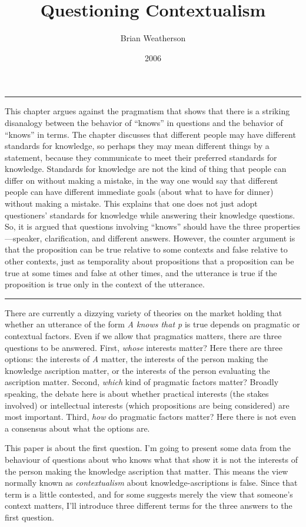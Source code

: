 \documentclass[
  10pt,
  letterpaper,
  DIV=11,
  numbers=noendperiod,
  twoside]{scrartcl}
\title{Questioning Contextualism}
\author{Brian Weatherson}
\date{2006}
\renewenvironment{abstract}
 {\vspace{-1.25cm}
 \quotation\small\noindent\rule{\linewidth}{.5pt}\par\smallskip
 \noindent }
 {\par\noindent\rule{\linewidth}{.5pt}\endquotation}
\begin{document}
\maketitle
\begin{abstract}
This chapter argues against the pragmatism that shows that there is a
striking disanalogy between the behavior of ``knows'' in questions and
the behavior of ``knows'' in terms. The chapter discusses that different
people may have different standards for knowledge, so perhaps they may
mean different things by a statement, because they communicate to meet
their preferred standards for knowledge. Standards for knowledge are not
the kind of thing that people can differ on without making a mistake, in
the way one would say that different people can have different immediate
goals (about what to have for dinner) without making a mistake. This
explains that one does not just adopt questioners' standards for
knowledge while answering their knowledge questions. So, it is argued
that questions involving ``knows'' should have the three
properties---speaker, clarification, and different answers. However, the
counter argument is that the proposition can be true relative to some
contexts and false relative to other contexts, just as temporality about
propositions that a proposition can be true at some times and false at
other times, and the utterance is true if the proposition is true only
in the context of the utterance.
\end{abstract}


There are currently a dizzying variety of theories on the market holding
that whether an utterance of the form \emph{A knows that p} is true
depends on pragmatic or contextual factors. Even if we allow that
pragmatics matters, there are three questions to be answered. First,
\emph{whose} interests matter? Here there are three options: the
interests of \emph{A} matter, the interests of the person making the
knowledge ascription matter, or the interests of the person evaluating
the ascription matter. Second, \emph{which} kind of pragmatic factors
matter? Broadly speaking, the debate here is about whether practical
interests (the stakes involved) or intellectual interests (which
propositions are being considered) are most important. Third, \emph{how}
do pragmatic factors matter? Here there is not even a consensus about
what the options are.

This paper is about the first question. I'm going to present some data
from the behaviour of questions about who knows what that show it is not
the interests of the person making the knowledge ascription that matter.
This means the view normally known as \emph{contextualism} about
knowledge-ascriptions is false. Since that term is a little contested,
and for some suggests merely the view that someone's context matters,
I'll introduce three different terms for the three answers to the first
question.
\end{document}
